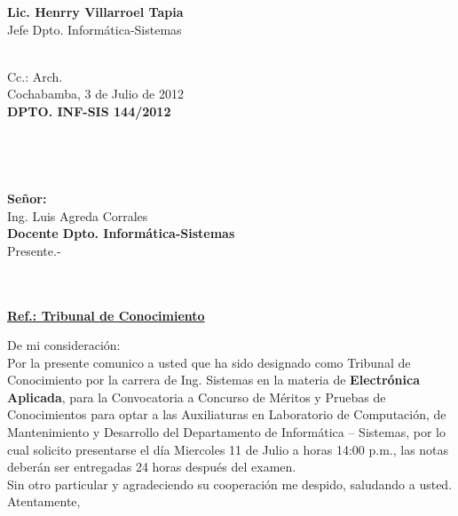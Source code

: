 \documentclass[letterpaper,11pt]{letter}
\begin{document}
\vspace{3.5cm}
\begin{center}
\begin{minipage}[b]{0.5\textwidth}
\begin{center}
{\bf Lic. Henrry Villarroel Tapia}\\
Jefe Dpto. Informática-Sistemas\\
\end{center}
\end{minipage}
\end{center}
~\\
Cc.: Arch.\\
\newpage
Cochabamba, 3 de Julio de 2012~\\
 \textbf{DPTO. INF-SIS 144/2012}\\
~\\
~\\
~\\
~\\
 \textbf{Señor:}~\\
Ing. Luis Agreda Corrales~\\
 \textbf{Docente Dpto. Informática-Sistemas}~\\
Presente.-\\
~\\
~\\
\begin{center}
\underline{ \textbf{Ref.: Tribunal de Conocimiento}}
\end{center}
De mi consideración:\\
Por la presente comunico a usted que ha sido designado como Tribunal de Conocimiento por la carrera de Ing. Sistemas en la materia de \textbf{Electrónica Aplicada}, para la Convocatoria a Concurso de Méritos y Pruebas de Conocimientos para optar a las Auxiliaturas en Laboratorio de Computación, de Mantenimiento y Desarrollo del Departamento de Informática – Sistemas, por lo cual solicito presentarse el día Miercoles 11 de Julio a horas 14:00 p.m., las notas deberán ser entregadas 24 horas después del examen.\\
Sin otro particular y agradeciendo su cooperación me despido, saludando a usted.\\
Atentamente,\\
\end{document}
